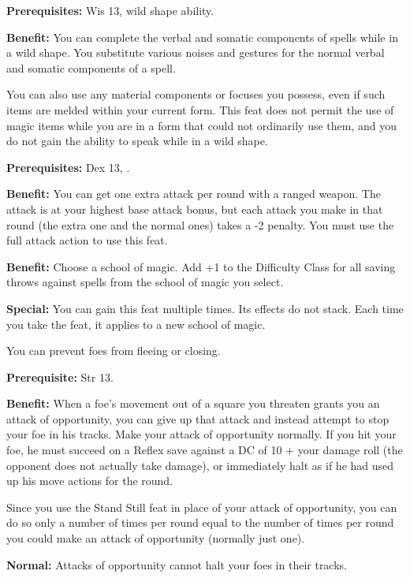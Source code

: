 
\textbf{Prerequisites:} Wis 13, wild shape ability.

\textbf{Benefit:} You can complete the verbal and somatic components of spells while in a wild shape. You substitute various noises and gestures for the normal verbal and somatic components of a spell.

You can also use any material components or focuses you possess, even if such items are melded within your current form. This feat does not permit the use of magic items while you are in a form that could not ordinarily use them, and you do not gain the ability to speak while in a wild shape.


\textbf{Prerequisites:} Dex 13, .

\textbf{Benefit:} You can get one extra attack per round with a ranged weapon. The attack is at your highest base attack bonus, but each attack you make in that round (the extra one and the normal ones) takes a -2 penalty. You must use the full attack action to use this feat.


\textbf{Benefit:} Choose a school of magic. Add +1 to the Difficulty Class for all saving throws against spells from the school of magic you select.

\textbf{Special:} You can gain this feat multiple times. Its effects do not stack. Each time you take the feat, it applies to a new school of magic.


You can prevent foes from fleeing or closing.

\textbf{Prerequisite:} Str 13.

\textbf{Benefit:} When a foe's movement out of a square you threaten grants you an attack of opportunity, you can give up that attack and instead attempt to stop your foe in his tracks. Make your attack of opportunity normally. If you hit your foe, he must succeed on a Reflex save against a DC of 10 + your damage roll (the opponent does not actually take damage), or immediately halt as if he had used up his move actions for the round.

Since you use the Stand Still feat in place of your attack of opportunity, you can do so only a number of times per round equal to the number of times per round you could make an attack of opportunity (normally just one).

\textbf{Normal:} Attacks of opportunity cannot halt your foes in their tracks.
